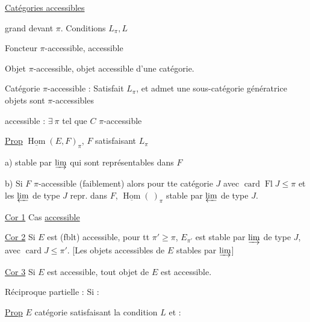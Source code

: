 
\uline{Catégories accessibles}

  grand devant $\pi$. Conditions $L_\pi,L$

Foncteur $\pi$-accessible, accessible

Objet $\pi$-accessible, objet accessible d'une catégorie.

Catégorie $\pi$-accessible : Satisfait $L_\pi$, et admet une  sous-catégorie  génératrice   objets sont $\pi$-accessibles


accessible : $\exists\ \pi$ tel que $C$ $\pi$-accessible

\uline{Prop}  $\underline{\operatorname{Hom}}(E,F)_\pi$, $F$ satisfaisant $L_\pi$

a) stable par  $\varinjlim$ qui sont représentables dans $F$

b) Si $F$ $\pi$-accessible (faiblement) alors pour tte catégorie $J$ avec $\operatorname{card}\operatorname{Fl}J\leq\pi$ et les $\varprojlim$ de type $J$ repr. dans $F$, $\underline{\operatorname{Hom}}(\ )_\pi$ stable par $\varprojlim$ de type $J$.


\uline{Cor 1} Cas \uline{accessible}

\uline{Cor 2}  Si $E$ est (fblt) \deleted{\unsure{$\pi$}} \inserted{$\pi$-}accessible,  pour tt $\pi'\geq\pi$, $E_{\pi'}$ est stable par $\varinjlim$ de type $J$, avec $\operatorname{card} J\leq\pi'$. [Les objets accessibles de $E$ stables par  $\varinjlim$]

\uline{Cor 3} Si $E$ est accessible, tout objet de $E$ est accessible.

Réciproque  partielle : Si :

\uline{Prop}  $E$ catégorie satisfaisant la condition $L$ et :

